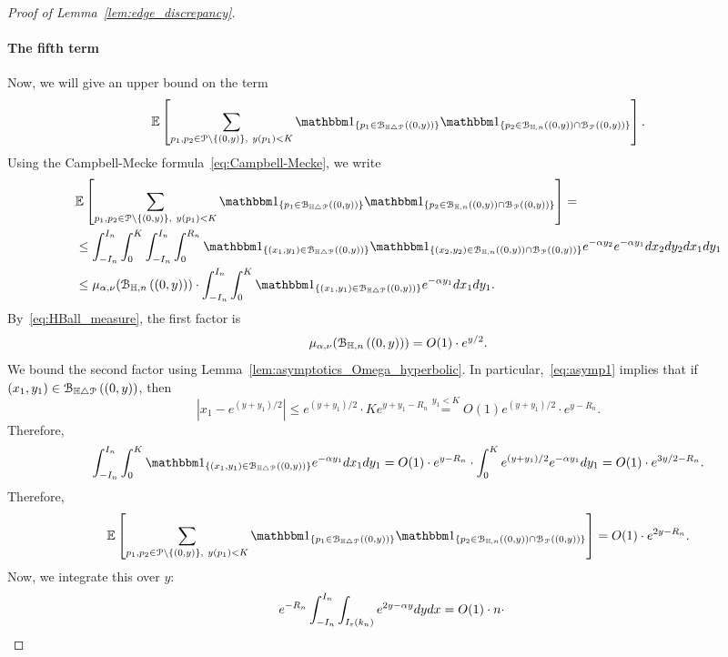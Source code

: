 \begin{proof}[Proof of Lemma~\ref{lem:edge_discrepancy}]
\paragraph{The fifth term}
Now, we will give an upper  bound on the term
\begin{equation*}
\Exp { \sum_{p_1,p_2 \in\Pcal \setminus \{(0,y)\}, \ y(p_1) < K}
\ind{p_1\in \BallSym{(0,y)}} \ind{p_2\in \BallHyp{(0,y)}\cap \BallPo{(0,y)}}}.
\end{equation*}
Using the Campbell-Mecke formula~\eqref{eq:Campbell-Mecke}, we write 
\begin{equation*}
\begin{split}
&\Exp { \sum_{p_1,p_2 \in\Pcal \setminus \{(0,y)\}, \ y(p_1) < K}
\ind{p_1\in \BallSym{(0,y)}} \ind{p_2\in \BallHyp{(0,y)}\cap \BallPo{(0,y)}}} =\\
&\leq \int_{-I_n}^{I_n} \int_0^K \int_{-I_n}^{I_n} \int_0^{R_n} 
\ind{(x_1,y_1) \in \BallSym{(0,y)}} 
 \ind{(x_2,y_2) \in \BallHyp{(0,y)}\cap \BallPo{(0,y)}} e^{-\alpha y_2} e^{-\alpha y_1} 
 dx_2 dy_2 dx_1 dy_1 \\
 &\leq  \mu_{\alpha, \nu} (\BallHyp{(0,y)})\cdot
 \int_{-I_n}^{I_n} \int_0^K \ind{(x_1,y_1) \in \BallSym{(0,y)}} 
e^{-\alpha y_1}  dx_1 dy_1.
\end{split}
\end{equation*}
By~\eqref{eq:HBall_measure},  the first factor is 
$$ \mu_{\alpha, \nu} ({\mathcal B}_{\mathbb{H},n}\left((0,y)\right)) =O(1) \cdot e^{y/2}. $$ 
We bound the second factor using Lemma~\ref{lem:asymptotics_Omega_hyperbolic}. 
In particular,~\eqref{eq:asymp1} implies that 
if $(x_1,y_1) \in {\mathcal B}_{\mathbb{H} \bigtriangleup {\mathcal P}}\left((0,y)\right)$, then 
$$ |x_1 - e^{(y+y_1)/2} |\leq e^{(y+y_1)/2} \cdot K e^{y+y_1- R_n} \stackrel{y_1<K}{=} O(1) 
e^{(y+y_1)/2} \cdot e^{y- R_n}.$$
Therefore, 
$$ \int_{-I_n}^{I_n} \int_0^K \ind{(x_1,y_1) \in \BallSym{(0,y)}} 
e^{-\alpha y_1}  dx_1 dy_1 = O(1) \cdot e^{y-R_n} 
\cdot \int_0^K e^{(y+y_1)/2} 
e^{-\alpha y_1}   dy_1 = O(1)\cdot e^{3y/2 - R_n}. 
$$
Therefore, 
\begin{equation*}
\begin{split}
\Exp { \sum_{p_1,p_2 \in\Pcal \setminus \{(0,y)\}, \ y(p_1) < K}
\ind{p_1\in \BallSym{(0,y)}} \ind{p_2\in \BallHyp{(0,y)}\cap \BallPo{(0,y)}}} =
O(1) \cdot e^{2y - R_n}.
\end{split}
\end{equation*}
Now, we integrate this over $y$: 
\begin{equation*}
\begin{split}
&e^{-R_n} \int_{-I_n}^{I_n} \int_{I_\eps (k_n)} e^{2y -\alpha y} dy dx = O(1) \cdot n \cdot 

\end{split}
\end{equation*}
\end{proof}
